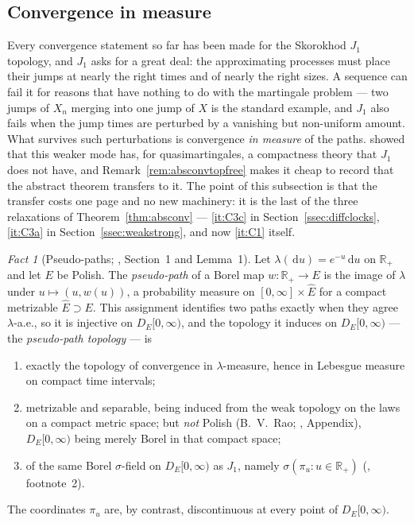 \documentclass[11pt,a4paper]{article}
\theoremstyle{plain}
\theoremstyle{definition}
\theoremstyle{remark}
\newtheorem{fact}[theorem]{Fact}
\newcommand{\R}{\mathbb{R}}
\newcommand{\Rp}{\R_+}
\newcommand{\DE}{D_E[0,\infty)}
\newcommand{\dif}{\,\mathrm{d}}
\newcommand{\MZ}{\cite{MZ84}}
\begin{document}
\subsection{Convergence in measure}
\label{ssec:measureconv}

Every convergence statement so far has been made for the Skorokhod $J_1$
topology, and $J_1$ asks for a great deal: the approximating processes must place
their jumps at nearly the right times and of nearly the right sizes.  A sequence
can fail it for reasons that have nothing to do with the martingale problem --- two
jumps of $X_n$ merging into one jump of $X$ is the standard example, and $J_1$
also fails when the jump times are perturbed by a vanishing but non-uniform
amount.  What survives such perturbations is convergence \emph{in measure} of the
paths.  \MZ{} showed that this weaker mode has, for quasimartingales, a
compactness theory that $J_1$ does not have, and Remark~\ref{rem:absconvtopfree}
makes it cheap to record that the abstract theorem transfers to it.  The point of
this subsection is that the transfer costs one page and no new machinery: it is
the last of the three relaxations of Theorem~\ref{thm:absconv} --- \ref{it:C3c}
in Section~\ref{ssec:diffclocks}, \ref{it:C3a} in Section~\ref{ssec:weakstrong},
and now \ref{it:C1} itself.

\begin{fact}[Pseudo-paths; \MZ, Section~1 and Lemma~1]
  \label{fact:pseudopath}
  Let $\lambda(\dif u) = e^{-u} \dif u$ on $\Rp$ and let $E$ be Polish.  The
  \emph{pseudo-path} of a Borel map $w : \Rp \to E$ is the image of $\lambda$
  under $u \mapsto (u, w(u))$, a probability measure on $[0,\infty] \times
  \hat{E}$ for a compact metrizable $\hat E \supset E$.  This assignment
  identifies two paths exactly when they agree $\lambda$-a.e., so it is injective
  on $\DE$, and the topology it induces on $\DE$ --- the \emph{pseudo-path
  topology} --- is
  \begin{enumerate}[label=(\roman*)]
  \item \label{it:pp_meas} exactly the topology of convergence in $\lambda$-measure,
    hence in Lebesgue measure on compact time intervals;
  \item \label{it:pp_sep} metrizable and separable, being induced from the weak
    topology on the laws on a compact metric space; but \emph{not} Polish
    (B.~V.~Rao; \MZ, Appendix), $\DE$ being merely Borel in that compact space;
  \item \label{it:pp_sigma} of the same Borel $\sigma$-field on $\DE$ as $J_1$,
    namely $\sigma(\pi_u : u \in \Rp)$ (\MZ, footnote~2).
  \end{enumerate}
  The coordinates $\pi_u$ are, by contrast, discontinuous at every point of $\DE$.
\end{fact}
\end{document}
